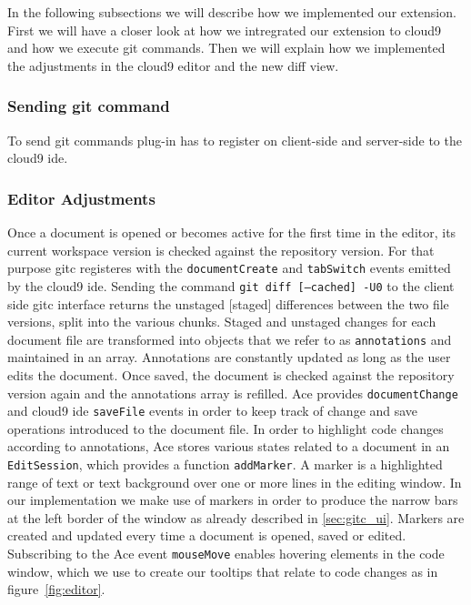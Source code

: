 In the following subsections we will describe how we implemented our extension.
First we will have a closer look at how we intregrated our extension to cloud9 and how we execute git commands.
Then we will explain how we implemented the adjustments in the cloud9 editor and the new diff view.

\subsubsection{Sending git command}

To send git commands plug-in has to register on client-side and server-side to the cloud9 ide.


\subsubsection{Editor Adjustments}

Once a document is opened or becomes active for the first time in the editor, its current workspace version is checked against the repository version. 
For that purpose gitc registeres with the \texttt{documentCreate} and \texttt{tabSwitch} events emitted by the cloud9 ide. 
Sending the command \texttt{git diff [--cached] -U0} to the client side gitc interface returns the unstaged [staged] differences between the two file versions, split into the various chunks. 
Staged and unstaged changes for each document file are transformed into objects that we refer to as \texttt{annotations} and maintained in an array. Annotations are constantly updated as long as the user edits the document. 
Once saved, the document is checked against the repository version again and the annotations array is refilled. 
Ace provides \texttt{documentChange} and cloud9 ide \texttt{saveFile} events in order to keep track of change and save operations introduced to the document file. 
In order to highlight code changes according to annotations, Ace stores various states related to a document in an \texttt{EditSession}, which provides a function \texttt{addMarker}. 
A marker is a highlighted range of text or text background over one or more lines in the editing window. 
In our implementation we make use of markers in order to produce the narrow bars at the left border of the window as already described in \ref{sec:gitc_ui}. 
Markers are created and updated every time a document is opened, saved or edited. 
Subscribing to the Ace event \texttt{mouseMove} enables hovering elements in the code window, which we use to create our tooltips that relate to code changes as in figure~\ref{fig:editor}.


